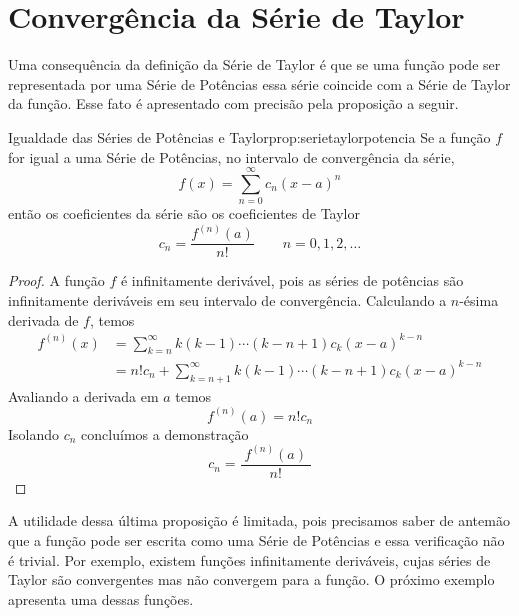 \section{Convergência da Série de Taylor}

Uma consequência da definição da Série de Taylor é que se uma função pode ser
representada por uma Série de Potências essa série coincide com
a Série de Taylor da função. Esse fato é apresentado com precisão pela
proposição a seguir.

\begin{proposicao}{Igualdade das Séries de Potências e Taylor}{prop:serietaylorpotencia}
  Se a função $f$ for igual a uma Série de Potências,
  no intervalo de convergência da série,
  \[
    f(x)=\sum_{n=0}^\infty c_n(x-a)^n
  \]
  então os coeficientes da série são os coeficientes de Taylor
  \[
    c_n = \frac{f^{(n)}(a)}{n!} \qquad n = 0, 1, 2, \dots
  \]
\end{proposicao}
\begin{proof}
  A função $f$ é infinitamente derivável, pois as séries de potências
  são infinitamente deriváveis em seu intervalo de convergência.
  Calculando a $n$-ésima derivada de $f$, temos
  \begin{align*}
    f^{(n)}(x) & = \sum_{k=n}^\infty k(k-1)\cdots(k-n+1)c_k(x-a)^{k-n}            \\
               & = n!c_n + \sum_{k=n+1}^\infty k(k-1)\cdots(k-n+1)c_k(x-a)^{k-n}
  \end{align*}
  Avaliando a derivada em $a$ temos
  \[
    f^{(n)}(a) = n!c_n
  \]
  Isolando $c_n$ concluímos a demonstração
  \[
    c_n = \frac{\;f^{(n)}(a)\;}{n!}
  \]
\end{proof}

A utilidade dessa última proposição é limitada, pois precisamos saber de antemão
que a função pode ser escrita como uma Série de Potências e essa verificação não
é trivial. Por exemplo, existem funções infinitamente deriváveis,
cujas séries de Taylor são convergentes mas não convergem para a função.
O próximo exemplo apresenta uma dessas funções.

